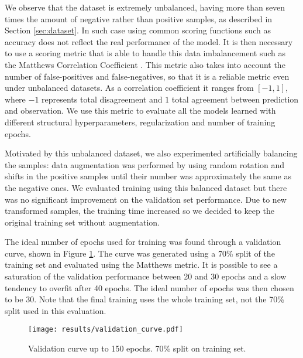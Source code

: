 	We observe that the dataset is extremely unbalanced, having more than seven times the amount of negative rather than positive samples, as described in Section \ref{sec:dataset}. In such case using common scoring functions such as accuracy does not reflect the real performance of the model. It is then necessary to use a scoring metric that is able to handle this data imbalancement such as the Matthews Correlation Coefficient \cite{evaluationMetrics}. This metric also takes into account the number of false-positives and false-negatives, so that it is a reliable metric even under unbalanced datasets. As a correlation coefficient it ranges from $[-1,1]$, where $-1$ represents total disagreement and $1$ total agreement between prediction and observation. We use this metric to evaluate all the models learned with different structural hyperparameters, regularization and number of training epochs.

	Motivated by this unbalanced dataset, we also experimented artificially balancing the samples: data augmentation was performed by using random rotation and shifts in the positive samples until their number was approximately the same as the negative ones. We evaluated training using this balanced dataset but there was no significant improvement on the validation set performance. Due to new transformed samples, the training time increased so we decided to keep the original training set without augmentation.

        The ideal number of epochs used for training was found through a validation curve, shown in Figure \ref{fig:validation_curve}. The curve was generated using a 70\% split of the training set and evaluated using the Matthews metric. It is possible to see a saturation of the validation performance between 20 and 30 epochs and a slow tendency to overfit after 40 epochs. The ideal number of epochs was then chosen to be 30. Note that the final training uses the whole training set, not the 70\% split used in this evaluation.

        \begin{figure}
        \centering
        \texttt{[image: results/validation\_curve.pdf]}
        \caption{Validation curve up to 150 epochs. 70\% split on training set.}
        \label{fig:validation_curve}
        \end{figure}

